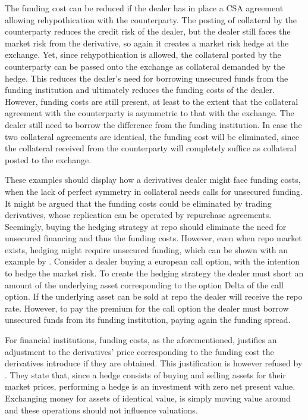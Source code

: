 \documentclass[../../../main.tex]{subfiles}
\begin{document}
        The funding cost can be reduced if the dealer has in place a CSA agreement allowing rehypothication with the counterparty.
        The posting of collateral by the counterparty reduces the credit risk of the dealer,
        but the dealer still faces the market risk from the derivative, 
        so again it creates a market risk hedge at the exchange.
        Yet, since rehypothication is allowed,
        the collateral posted by the counterparty can be passed onto the exchange as collateral demanded by the hedge.
        This reduces the dealer's need for borrowing unsecured funds from the funding institution 
        and ultimately reduces the funding costs of the dealer.
        However, funding costs are still present, 
        at least to the extent that the collateral agreement with the counterparty is asymmetric to that with the exchange.
        The dealer still need to borrow the difference from the funding institution.
        In case the two collateral agreements are identical, the funding cost will be eliminated, 
        since the collateral received from the counterparty will completely suffice as collateral posted to the exchange.

        These examples should display how a derivatives dealer might face funding costs,
        when the lack of perfect symmetry in collateral needs calls for unsecured funding.
        It might be argued that the funding costs could be eliminated by trading derivatives,
        whose replication can be operated by repurchase agreements. 
        Seemingly, buying the hedging strategy at repo should eliminate the need for unsecured financing
        and thus the funding costs. 
        However, even when repo market exists, hedging might require unsecured funding,
        which can be shown with an example by \cite{Castagna2012FVA}.
        Consider a dealer buying a european call option, with the intention to hedge the market risk.
        To create the hedging strategy the dealer must short an amount of the underlying asset corresponding to the option Delta of the call option.
        If the underlying asset can be sold at repo the dealer will receive the repo rate.
        However, to pay the premium for the call option the dealer must borrow unsecured funds from its funding institution,
        paying again the funding spread. 

        For financial institutions, funding costs, as the aforementioned, justifies an adjustment 
        to the derivatives' price corresponding to the funding cost the derivatives introduce if they are obtained.
        This justification is however refused by \cite{HullWhite2012FVA}.
        They state that, since a hedge consists of buying and selling assets for their market prices,
        performing a hedge is an investment with zero net present value.
        Exchanging money for assets of identical value,
        is simply moving value around and these operations should not influence valuations. 
\end{document}
